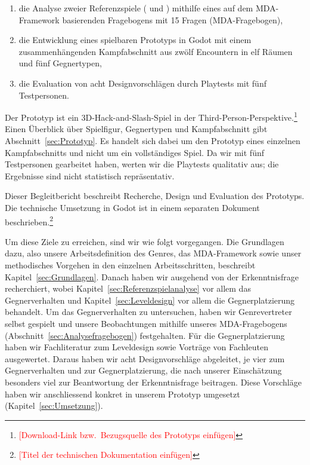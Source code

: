 \documentclass[../Main.tex]{subfiles}
\begin{document}
\begin{enumerate}
    \item die Analyse zweier Referenzspiele ( und ) mithilfe eines auf dem MDA-Framework basierenden Fragebogens mit 15 Fragen (MDA-Fragebogen),
    \item die Entwicklung eines spielbaren Prototyps in Godot mit einem zusammenhängenden Kampfabschnitt aus zwölf Encountern in elf Räumen und fünf Gegnertypen,
    \item die Evaluation von acht Designvorschlägen durch Playtests mit fünf Testpersonen.
\end{enumerate}

Der Prototyp ist ein 3D-Hack-and-Slash-Spiel in der Third-Person-Perspektive.\footnote{\textcolor{red}{[Download-Link bzw.\ Bezugsquelle des Prototyps einfügen]}} Einen Überblick über Spielfigur, Gegnertypen und Kampfabschnitt gibt Abschnitt~\ref{sec:Prototyp}. Es handelt sich dabei um den Prototyp eines einzelnen Kampfabschnitts und nicht um ein vollständiges Spiel. Da wir mit fünf Testpersonen gearbeitet haben, werten wir die Playtests qualitativ aus; die Ergebnisse sind nicht statistisch repräsentativ.

Dieser Begleitbericht beschreibt Recherche, Design und Evaluation des Prototyps. Die technische Umsetzung in Godot ist in einem separaten Dokument beschrieben.\footnote{\textcolor{red}{[Titel der technischen Dokumentation einfügen]}}

Um diese Ziele zu erreichen, sind wir wie folgt vorgegangen. Die Grundlagen dazu, also unsere Arbeitsdefinition des Genres, das MDA-Framework sowie unser methodisches Vorgehen in den einzelnen Arbeitsschritten, beschreibt Kapitel~\ref{sec:Grundlagen}. Danach haben wir ausgehend von der Erkenntnisfrage recherchiert, wobei Kapitel~\ref{sec:Referenzspielanalyse} vor allem das Gegnerverhalten und Kapitel~\ref{sec:Leveldesign} vor allem die Gegnerplatzierung behandelt. Um das Gegnerverhalten zu untersuchen, haben wir Genrevertreter selbst gespielt und unsere Beobachtungen mithilfe unseres MDA-Fragebogens (Abschnitt~\ref{sec:Analysefragebogen}) festgehalten. Für die Gegnerplatzierung haben wir Fachliteratur zum Leveldesign\autocite{totten2014architectural,rogers2014levelup} sowie Vorträge von Fachleuten\autocite{gdc_tenprinciples2010,gdc_leveldesignaday2020,gdc_movingmountains2020,gdc_horizonquests2018} ausgewertet. Daraus haben wir acht Designvorschläge abgeleitet, je vier zum Gegnerverhalten und zur Gegnerplatzierung, die nach unserer Einschätzung besonders viel zur Beantwortung der Erkenntnisfrage beitragen. Diese Vorschläge haben wir anschliessend konkret in unserem Prototyp umgesetzt (Kapitel~\ref{sec:Umsetzung}).
\end{document}
